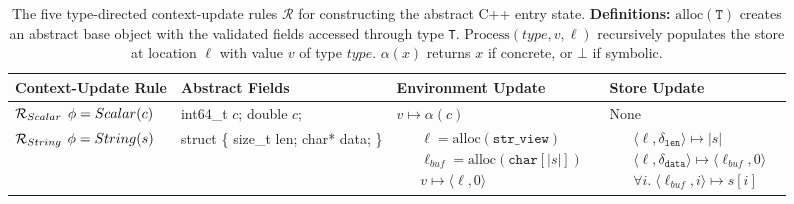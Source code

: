 \documentclass[manuscript,screen,review]{acmart}
\theoremstyle{indenteditalic}
\begin{document}
\begin{table}[htbp]
  \centering
  \caption{The five type-directed context-update rules $\mathcal{R}$ for constructing the abstract C++ entry state.
  \textbf{Definitions:} $\text{alloc}(\texttt{T})$ creates an abstract base object with the validated fields accessed through type \texttt{T}.
  $\text{Process}(\mathit{type}, v, \ell)$ recursively populates the store at location $\ell$ with value $v$ of type $\mathit{type}$.
  $\alpha(x)$ returns $x$ if concrete, or $\bot$ if symbolic.}
  \label{tab:semantic-rules}

  \newcommand{\thickhline}{\noalign{\hrule}}

  \renewcommand{\arraystretch}{1.5}
  \scriptsize

  \begin{tabular}{m{}|m{}|>{\raggedright\arraybackslash}m{}|>{\raggedright\arraybackslash}m{}}
    \thickhline
    \textbf{Context-Update Rule} & \textbf{Abstract Fields} & \textbf{Environment Update} & \textbf{Store Update} \\
    \hline

    $\mathcal{R}_{\textsc{Scalar}}$ \newline $\phi=\textsc{Scalar}(c)$ &
    {\ttfamily int64\_t $c$; \newline double $c$;} &
    $v \mapsto \alpha(c)$ &
    None \\ \hline

    $\mathcal{R}_{\textsc{String}}$ \newline $\phi=\textsc{String}(s)$ &
    {\ttfamily struct \{ \newline \hspace*{0.8em} size\_t len; \newline \hspace*{0.8em} char* data; \newline \}} &
\mbox{%
$\begin{aligned}
      & \ell = \text{alloc}(\texttt{str\_view}) \\
      & \ell_{buf} = \text{alloc}(\texttt{char}[|s|]) \\
      & v \mapsto \langle\ell, 0\rangle
    \end{aligned}$
}%
&
\mbox{%
$\begin{aligned}
      & \langle \ell, \delta_{\texttt{len}} \rangle \mapsto |s| \\
      & \langle \ell, \delta_{\texttt{data}} \rangle \mapsto \langle\ell_{buf}, 0\rangle \\
      & \forall i.\; \langle \ell_{buf}, i \rangle \mapsto s[i]
    \end{aligned}$
}%
\\ \hline


\end{tabular}
\end{table}
\end{document}

